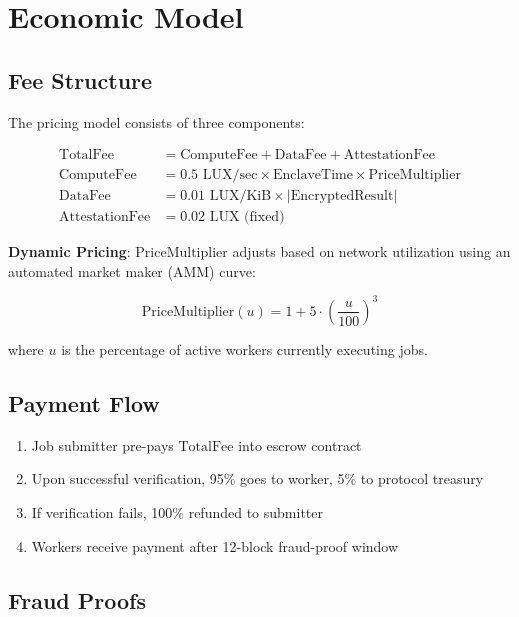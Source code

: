 \section{Economic Model}

\label{sec:economics}

\subsection{Fee Structure}

The pricing model consists of three components:

\begin{align}
\text{TotalFee} &= \text{ComputeFee} + \text{DataFee} + \text{AttestationFee} \\
\text{ComputeFee} &= 0.5 \text{ LUX/sec} \times \text{EnclaveTime} \times \text{PriceMultiplier} \\
\text{DataFee} &= 0.01 \text{ LUX/KiB} \times |\text{EncryptedResult}| \\
\text{AttestationFee} &= 0.02 \text{ LUX (fixed)}
\end{align}

\textbf{Dynamic Pricing}: $\text{PriceMultiplier}$ adjusts based on network utilization using an automated market maker (AMM) curve:

\begin{equation}
\text{PriceMultiplier}(u) = 1 + 5 \cdot \left(\frac{u}{100}\right)^3
\end{equation}

where $u$ is the percentage of active workers currently executing jobs.

\subsection{Payment Flow}

\begin{enumerate}
  \item Job submitter pre-pays $\text{TotalFee}$ into escrow contract
  \item Upon successful verification, 95\% goes to worker, 5\% to protocol treasury
  \item If verification fails, 100\% refunded to submitter
  \item Workers receive payment after 12-block fraud-proof window
\end{enumerate}

\subsection{Fraud Proofs}

